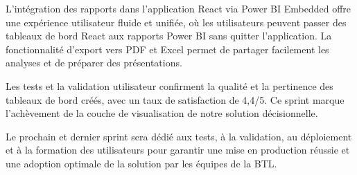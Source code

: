 L'intégration des rapports dans l'application React via Power BI Embedded offre une expérience utilisateur fluide et unifiée, où les utilisateurs peuvent passer des tableaux de bord React aux rapports Power BI sans quitter l'application. La fonctionnalité d'export vers PDF et Excel permet de partager facilement les analyses et de préparer des présentations.

Les tests et la validation utilisateur confirment la qualité et la pertinence des tableaux de bord créés, avec un taux de satisfaction de 4,4/5. Ce sprint marque l'achèvement de la couche de visualisation de notre solution décisionnelle.

Le prochain et dernier sprint sera dédié aux tests, à la validation, au déploiement et à la formation des utilisateurs pour garantir une mise en production réussie et une adoption optimale de la solution par les équipes de la BTL.